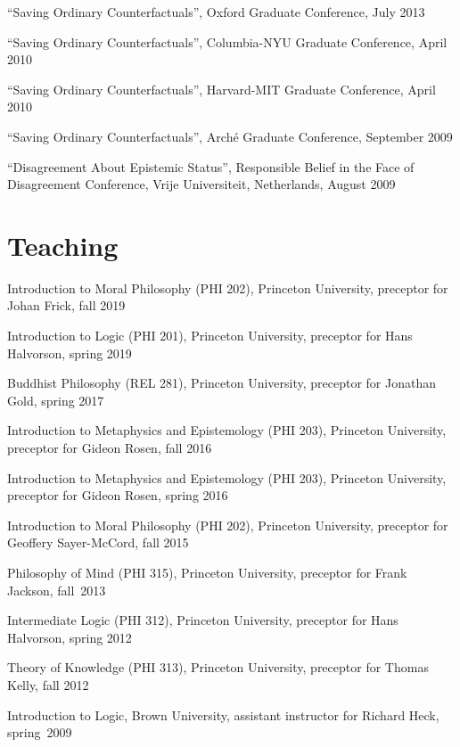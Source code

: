 \documentclass{cv_07152020}
\begin{document}
\begin{etaremune}
	\item ``Saving Ordinary Counterfactuals'', Oxford Graduate Conference, July 2013
	\item ``Saving Ordinary Counterfactuals'', Columbia-NYU Graduate Conference, April 2010
	\item ``Saving Ordinary Counterfactuals'', Harvard-MIT Graduate Conference, April 2010
	\item ``Saving Ordinary Counterfactuals'', Arché Graduate Conference, September 2009
	\item ``Disagreement About Epistemic Status'', Responsible Belief in the Face of Disagreement Conference, Vrije Universiteit, Netherlands, August 2009
\end{etaremune}

		
		
\section*{Teaching}
\medskip
\begin{etaremune}
	\item Introduction to Moral Philosophy (PHI 202), Princeton University, preceptor for Johan Frick, fall 2019
	\item Introduction to Logic (PHI 201), Princeton University, preceptor for Hans Halvorson, spring 2019
	\item Buddhist Philosophy (REL 281), Princeton University, preceptor for Jonathan Gold, spring 2017
	\item Introduction to Metaphysics and Epistemology (PHI 203), Princeton University, preceptor for Gideon Rosen, fall 2016 		
	\item Introduction to Metaphysics and Epistemology (PHI 203), Princeton University, preceptor for Gideon Rosen, spring 2016
	\item Introduction to Moral Philosophy (PHI 202), Princeton University, preceptor for Geoffery Sayer-McCord, fall 2015
	\item Philosophy of Mind (PHI 315), Princeton University, preceptor for Frank Jackson, \mbox{fall 2013}
	\item Intermediate Logic (PHI 312), Princeton University, preceptor for Hans Halvorson, spring 2012
	\item Theory of Knowledge (PHI 313), Princeton University, preceptor for Thomas Kelly, fall 2012
	\item Introduction to Logic, Brown University, assistant instructor for Richard Heck, \mbox{spring 2009}			
\end{etaremune}
\end{document}
